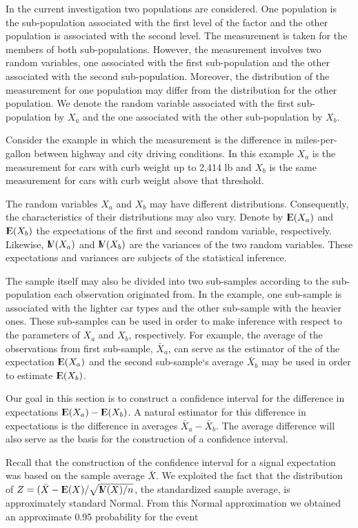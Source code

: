 \documentclass[]{krantz}
\newcommand{\Expec}{{\rm I\kern-.3em E}}
\newcommand{\Var}{{\rm I\kern-.3em V}}
\theoremstyle{definition}
\theoremstyle{definition}
\theoremstyle{definition}
\theoremstyle{remark}
\begin{document}
In the current investigation two populations are considered. One
population is the sub-population associated with the first level of the
factor and the other population is associated with the second level. The
measurement is taken for the members of both sub-populations. However,
the measurement involves two random variables, one associated with the
first sub-population and the other associated with the second
sub-population. Moreover, the distribution of the measurement for one
population may differ from the distribution for the other population. We
denote the random variable associated with the first sub-population by
\(X_a\) and the one associated with the other sub-population by \(X_b\).

Consider the example in which the measurement is the difference in
miles-per-gallon between highway and city driving conditions. In this
example \(X_a\) is the measurement for cars with curb weight up to 2,414
lb and \(X_b\) is the same measurement for cars with curb weight above
that threshold.

The random variables \(X_a\) and \(X_b\) may have different
distributions. Consequently, the characteristics of their distributions
may also vary. Denote by \(\Expec(X_a)\) and \(\Expec(X_b)\) the
expectations of the first and second random variable, respectively.
Likewise, \(\Var(X_a)\) and \(\Var(X_b)\) are the variances of the two
random variables. These expectations and variances are subjects of the
statistical inference.

The sample itself may also be divided into two sub-samples according to
the sub-population each observation originated from. In the example, one
sub-sample is associated with the lighter car types and the other
sub-sample with the heavier ones. These sub-samples can be used in order
to make inference with respect to the parameters of \(X_a\) and \(X_b\),
respectively. For example, the average of the observations from first
sub-sample, \(\bar X_a\), can serve as the estimator of the of the
expectation \(\Expec(X_a)\) and the second sub-sample`s average
\(\bar X_b\) may be used in order to estimate \(\Expec(X_b)\).

Our goal in this section is to construct a confidence interval for the
difference in expectations \(\Expec(X_a)-\Expec(X_b)\). A natural
estimator for this difference in expectations is the difference in
averages \(\bar X_a- \bar X_b\). The average difference will also serve
as the basis for the construction of a confidence interval.

Recall that the construction of the confidence interval for a signal
expectation was based on the sample average \(\bar X\). We exploited the
fact that the distribution of
\(Z = (\bar X - \Expec(X)/\sqrt{\Var(X)/n}\), the standardized sample
average, is approximately standard Normal. From this Normal
approximation we obtained an approximate 0.95 probability for the event
\end{document}
